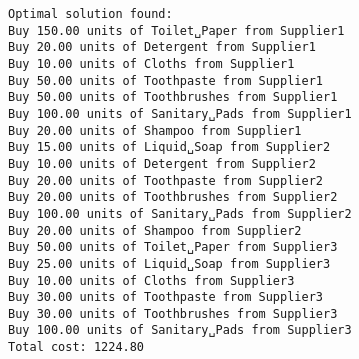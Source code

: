 \documentclass[11pt]{article}
\begin{document}
    \begin{Verbatim}[commandchars=\\\{\}]
Optimal solution found:
Buy 150.00 units of Toilet␣Paper from Supplier1
Buy 20.00 units of Detergent from Supplier1
Buy 10.00 units of Cloths from Supplier1
Buy 50.00 units of Toothpaste from Supplier1
Buy 50.00 units of Toothbrushes from Supplier1
Buy 100.00 units of Sanitary␣Pads from Supplier1
Buy 20.00 units of Shampoo from Supplier1
Buy 15.00 units of Liquid␣Soap from Supplier2
Buy 10.00 units of Detergent from Supplier2
Buy 20.00 units of Toothpaste from Supplier2
Buy 20.00 units of Toothbrushes from Supplier2
Buy 100.00 units of Sanitary␣Pads from Supplier2
Buy 20.00 units of Shampoo from Supplier2
Buy 50.00 units of Toilet␣Paper from Supplier3
Buy 25.00 units of Liquid␣Soap from Supplier3
Buy 10.00 units of Cloths from Supplier3
Buy 30.00 units of Toothpaste from Supplier3
Buy 30.00 units of Toothbrushes from Supplier3
Buy 100.00 units of Sanitary␣Pads from Supplier3
Total cost: 1224.80
    \end{Verbatim}


    
    
    
\end{document}
